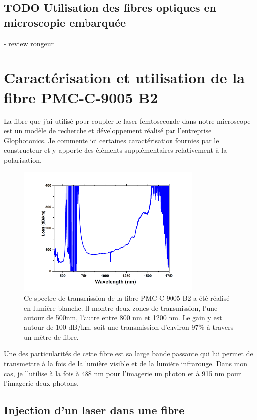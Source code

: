 \subsection{TODO Utilisation des fibres optiques en microscopie embarquée}

- review rongeur

\section{Caractérisation et utilisation de la fibre PMC-C-9005 B2}

La fibre que j'ai utilisé pour coupler le laser femtoseconde dans notre microscope est un modèle de recherche et développement réalisé par l'entreprise \href{http://www.glophotonics.fr/}{Glophotonics}. Je commente ici certaines caractérisation fournies par le constructeur et y apporte des éléments supplémentaires relativement à la polarisation.

\begin{figure}
\centering
\includegraphics[width=0.8\textwidth]{./files/fiber_gain.png}
\caption{Ce spectre de transmission de la fibre PMC-C-9005 B2 a été réalisé en lumière blanche. Il montre deux zones de transmission, l'une autour de 500nm, l'autre entre 800 nm et 1200 nm. Le gain y est autour de 100 dB/km, soit une transmission d'environ 97\% à travers un mètre de fibre.}
\end{figure}

Une des particularités de cette fibre est sa large bande passante qui lui permet de transmettre à la fois de la lumière visible et de la lumière infrarouge. Dans mon cas, je l'utilise à la fois à 488 nm pour l'imagerie un photon et à 915 nm pour l'imagerie deux photons.

\subsection{Injection d'un laser dans une fibre}

